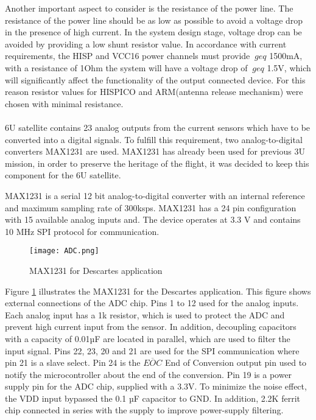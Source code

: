   \label{Tab:res}
 Another important aspect to consider is the resistance of the power line. The resistance of the power line should be as low as possible to avoid a voltage drop in the presence of high current. In the system design stage, voltage drop can be avoided by providing a low shunt resistor value. In accordance with current requirements, the HISP and VCC16 power channels must provide $ \ geq $ 1500mA, with a resistance of 1Ohm the system will have a voltage drop of $ \ geq $ 1.5V, which will significantly affect the functionality of the output connected device.
 For this reason resistor values for HISPICO and ARM(antenna release mechanism) were chosen with minimal resistance.\\ \\ 
 
 6U satellite contains 23 analog outputs from the current sensors which have to be converted into a digital signals. To fulfill this requirement, two analog-to-digital converters MAX1231 are used. MAX1231 has already been used for previous 3U mission, in order to preserve the heritage of the flight, it was decided to keep this component for the 6U satellite.
 
  \cite{25}MAX1231 is a serial 12 bit  analog-to-digital converter with an internal reference and maximum sampling rate of 300ksps. MAX1231 has a 24 pin configuration with 15 available analog inputs and. The device operates at 3.3 V and contains 10 MHz SPI protocol for communication.
  
   \begin{figure}[h]
   	\centering
   	\texttt{[image: ADC.png]}
   	\caption{MAX1231 for Descartes application}
   	\label{fig: adc}
   \end{figure} 
 
  Figure \ref{fig: adc} illustrates the MAX1231 for the Descartes application. This figure shows external connections of the ADC chip. Pins 1 to 12 used for the analog inputs. Each analog input has a 1k resistor, which is used to protect the ADC and prevent high current input from the sensor. In addition, decoupling capacitors with a capacity of 0.01µF are located in parallel, which are used to filter the input signal. Pins 22, 23, 20 and 21 are used for the SPI communication where pin 21 is a slave select. Pin 24 is the $\overline{EOC}$ End of Conversion output pin used to notify the microcontroller about the end of the conversion. Pin 19 is a power supply pin for the ADC chip, supplied with a 3.3V. To minimize the noise effect, the VDD input bypassed the 0.1 µF capacitor to GND. In addition, 2.2K ferrit chip connected in series with the supply to improve power-supply filtering. 
  
